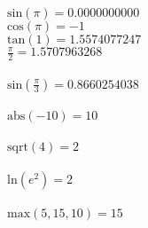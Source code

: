 \documentclass{article}
\begin{document}
\\$\text{sin}(\pi) = 0.0000000000$\\
$\text{cos}(\pi) = -1$\\
$\text{tan}(1) = 1.5574077247$\\
$\frac{\pi}{2} = 1.5707963268$\\
\\$\text{sin}(\frac{\pi}{3}) = 0.8660254038$\\
\\$\text{abs}(-10) = 10$\\
\\$\text{sqrt}(4) = 2$\\
\\$\text{ln}(e^{2}) = 2$\\
\\$\text{max}(5,15,10) = 15$\\
\end{document}
